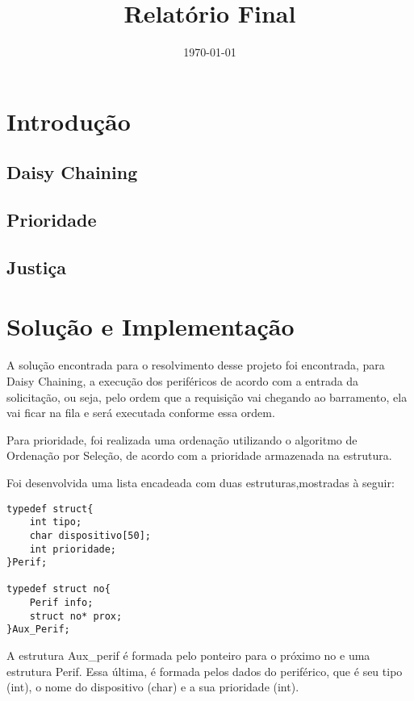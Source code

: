 \documentclass[12pt, oneside,a4paper, brazil]{abntex2}
\title{Relatório Final}
\date{\today}
\begin{document}

\frenchspacing
\imprimircapa
\imprimirfolhaderosto

\tableofcontents
\chapter{Introdução}
\section{Daisy Chaining}
\section{Prioridade}
\section{Justiça}
\chapter{Solução e Implementação}
A solução encontrada para o resolvimento desse projeto foi encontrada, para Daisy Chaining, a execução dos periféricos de acordo com a entrada da solicitação, ou seja, pelo ordem que a requisição vai chegando ao barramento, ela vai ficar na fila e será executada conforme essa ordem. 

Para prioridade, foi realizada uma ordenação utilizando o algoritmo de Ordenação por Seleção, de acordo com a prioridade armazenada na estrutura. 

Foi desenvolvida uma lista encadeada com duas estruturas,mostradas à seguir: 
\begin{lstlisting}
typedef struct{
	int tipo;
	char dispositivo[50];
	int prioridade;
}Perif;

typedef struct no{
	Perif info;
	struct no* prox;
}Aux_Perif;
\end{lstlisting}

A estrutura Aux\_perif é formada pelo ponteiro para o próximo no e uma estrutura Perif. Essa última, é formada pelos dados do periférico, que é seu tipo (int), o nome do dispositivo (char) e a sua prioridade (int).
\end{document}

